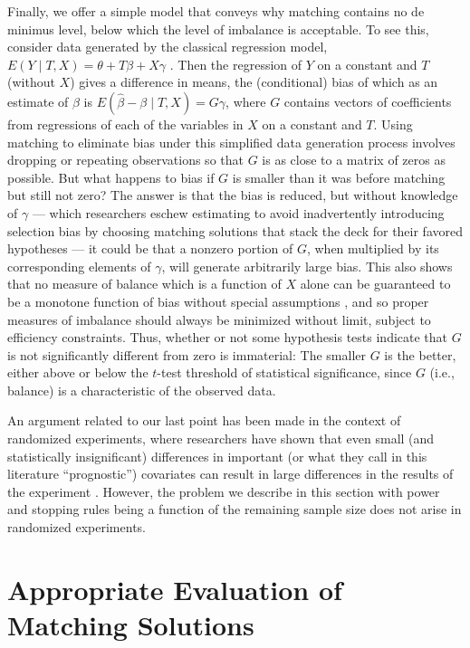 \documentclass[11pt,titlepage]{article}
\begin{document}
Finally, we offer a simple model that conveys why matching contains no
de minimus level, below which the level of imbalance is acceptable.
To see this, consider data generated by the classical regression
model, $E(Y\mid T,X)= \theta + T\beta + X\gamma$ \citep{Goldberger91}.
Then the regression of $Y$ on a constant and $T$ (without $X$) gives a
difference in means, the (conditional) bias of which as an estimate of
$\beta$ is $E(\hat\beta-\beta\mid T,X) = G\gamma$, where $G$ contains
vectors of coefficients from regressions of each of the variables in
$X$ on a constant and $T$.  Using matching to eliminate bias under
this simplified data generation process involves dropping or repeating
observations so that $G$ is as close to a matrix of zeros as possible.
But what happens to bias if $G$ is smaller than it was before matching
but still not zero?  The answer is that the bias is reduced, but
without knowledge of $\gamma$ --- which researchers eschew estimating
to avoid inadvertently introducing selection bias by choosing matching
solutions that stack the deck for their favored hypotheses --- it
could be that a nonzero portion of $G$, when multiplied by its
corresponding elements of $\gamma$, will generate arbitrarily large
bias.  This also shows that no measure of balance which is a function
of $X$ alone can be guaranteed to be a monotone function of bias
without special assumptions \citep{RubStu06}, and so proper measures
of imbalance should always be minimized without limit, subject to
efficiency constraints.  Thus, whether or not some hypothesis tests
indicate that $G$ is not significantly different from zero is
immaterial: The smaller $G$ is the better, either above or below the
$t$-test threshold of statistical significance, since $G$ (i.e.,
balance) is a characteristic of the observed data.  

An argument related to our last point has been made in the context of
randomized experiments, where researchers have shown that even small
(and statistically insignificant) differences in important (or what
they call in this literature ``prognostic'') covariates can result in
large differences in the results of the experiment
\citep{Altman85,Senn94,PocAssEno02}.  However, the problem we describe
in this section with power and stopping rules being a function of the
remaining sample size does not arise in randomized experiments.


\section{Appropriate Evaluation of Matching Solutions}
\end{document}
